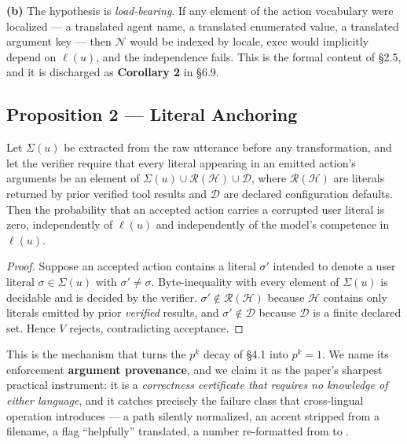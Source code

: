 \textbf{(b)} The hypothesis is \emph{load-bearing}. If any element of the action vocabulary were localized --- a translated agent name, a translated enumerated value, a translated argument key --- then $\mathcal{N}$ would be indexed by locale, $\mathrm{exec}$ would implicitly depend on $\ell(u)$, and the independence fails. This is the formal content of \S2.5, and it is discharged as \textbf{Corollary 2} in \S6.9.

\subsection{Proposition 2 --- Literal Anchoring}
\label{sec:literal-anchoring}

\begin{proposition}
\label{prop:anchoring}
Let $\Sigma(u)$ be extracted from the raw utterance before any transformation, and let the verifier require that every literal appearing in an emitted action's arguments be an element of $\Sigma(u) \cup \mathcal{R}(\mathcal{H}) \cup \mathcal{D}$, where $\mathcal{R}(\mathcal{H})$ are literals returned by prior verified tool results and $\mathcal{D}$ are declared configuration defaults. Then the probability that an accepted action carries a corrupted user literal is zero, independently of $\ell(u)$ and independently of the model's competence in $\ell(u)$.
\end{proposition}

\begin{proof}
Suppose an accepted action contains a literal $\sigma'$ intended to denote a user literal $\sigma \in \Sigma(u)$ with $\sigma' \neq \sigma$. Byte-inequality with every element of $\Sigma(u)$ is decidable and is decided by the verifier. $\sigma' \notin \mathcal{R}(\mathcal{H})$ because $\mathcal{H}$ contains only literals emitted by prior \emph{verified} results, and $\sigma' \notin \mathcal{D}$ because $\mathcal{D}$ is a finite declared set. Hence $V$ rejects, contradicting acceptance.
\end{proof}

This is the mechanism that turns the $p^{k}$ decay of \S4.1 into $p^{k} = 1$. We name its enforcement \textbf{argument provenance}, and we claim it as the paper's sharpest practical instrument: it is a \emph{correctness certificate that requires no knowledge of either language}, and it catches precisely the failure class that cross-lingual operation introduces --- a path silently normalized, an accent stripped from a filename, a flag ``helpfully'' translated, a number re-formatted from  to .

